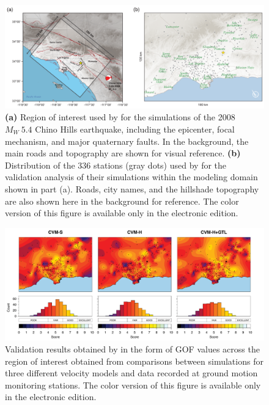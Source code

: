 \begin{figure}[ht!]
    \centering
    \includegraphics[width=\textwidth]{figures/pdf/figure-01}
    \caption{\textbf{(a)} Region of interest used by \citet{Taborda_2014_BSSA} for the simulations of the 2008 $M_W ~ 5.4$ Chino Hills earthquake, including the epicenter, focal mechanism, and major quaternary faults. In the background, the main roads and topography are shown for visual reference. \textbf{(b)} Distribution of the 336 stations (gray dots) used by \citet{Taborda_2014_BSSA} for the validation analysis of their simulations within the modeling domain shown in part (a). Roads, city names, and the hillshade topography are also shown here in the background for reference. The color version of this figure is available only in the electronic edition.}
    \label{fig:chino-hills}
\end{figure}

\begin{figure}[t]
    \centering
    \includegraphics[width=\textwidth]{figures/pdf/figure-02}
    \caption{Validation results obtained by \citet{Taborda_2014_BSSA} in the form of GOF values across the region of interest obtained from comparisons between simulations for three different velocity models and data recorded at ground motion monitoring stations.  The color version of this figure is available only in the electronic edition.}
    \label{fig:ref-gof-maps}
\end{figure}

